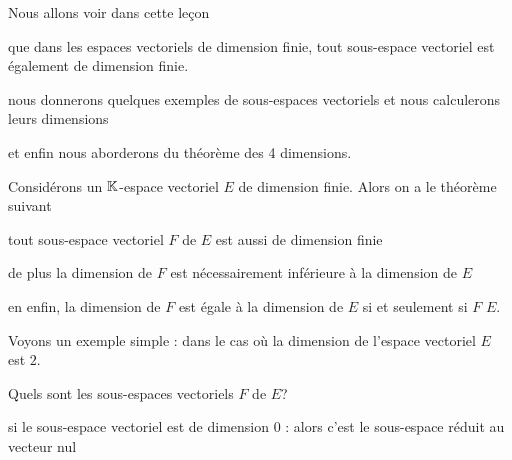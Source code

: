 






\debuttexte


\diapo

% 
% 
%   
% 

\change
Nous allons voir dans cette le\c{c}on 

\change
que dans les espaces vectoriels de dimension finie, tout sous-espace vectoriel est également de dimension finie.

\change
nous donnerons quelques exemples de sous-espaces vectoriels et nous calculerons leurs dimensions 

\change
et enfin nous aborderons du théorème des 4 dimensions.


\diapo
Considérons un $\mathbb{K}$-espace vectoriel $E$ de dimension finie. Alors on a le théorème suivant

\change
tout sous-espace vectoriel $F$ de $E$ est aussi de dimension finie 

\change
de plus la dimension de $F$ est nécessairement inférieure à la dimension de $E$

\change
en enfin, la dimension de $F$ est égale à la dimension de $E$ si et seulement si $F$  $E$.


\diapo
Voyons un exemple simple : dans le cas o\`u la dimension de l'espace vectoriel $E$ est $2$.

\change
Quels sont les sous-espaces vectoriels $F$ de $E$?

\change
si le sous-espace vectoriel est  de dimension $0$ : alors c'est  le sous-espace réduit au vecteur nul

